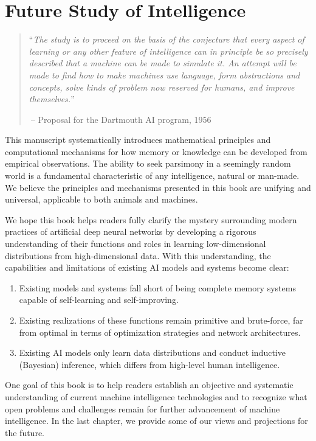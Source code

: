 \documentclass[../../book-main.tex]{subfiles}
\begin{document}
\chapter{Future Study of Intelligence}
\label{ch:future}


  

\begin{quote}
``{\em The study is to proceed on the basis of the conjecture that every aspect of learning or any other feature of intelligence can in principle be so precisely described that a machine can be made to simulate it. An attempt will be made to find how to make machines use language, form abstractions and concepts, solve kinds of problem now reserved for humans, and improve themselves.}''

$~$\hfill -- Proposal for the Dartmouth AI program, 1956
 \end{quote}
\vspace{5mm}


This manuscript systematically introduces mathematical principles and computational mechanisms for how memory or knowledge can be developed from empirical observations. The ability to seek parsimony in a seemingly random world is a fundamental characteristic of any intelligence, natural or man-made. We believe the principles and mechanisms presented in this book are unifying and universal, applicable to both animals and machines.

We hope this book helps readers fully clarify the mystery surrounding modern practices of artificial deep neural networks by developing a rigorous understanding of their functions and roles in learning low-dimensional distributions from high-dimensional data. With this understanding, the capabilities and limitations of existing AI models and systems become clear:
\begin{enumerate}
    \item Existing models and systems fall short of being complete memory systems capable of self-learning and self-improving.
    \item Existing realizations of these functions remain primitive and brute-force, far from optimal in terms of optimization strategies and network architectures.
    \item Existing AI models only learn data distributions and conduct inductive (Bayesian) inference, which differs from high-level human intelligence.
\end{enumerate}

One goal of this book is to help readers establish an objective and systematic understanding of current machine intelligence technologies and to recognize what open problems and challenges remain for further advancement of machine intelligence. In the last chapter, we provide some of our views and projections for the future.
\end{document}
